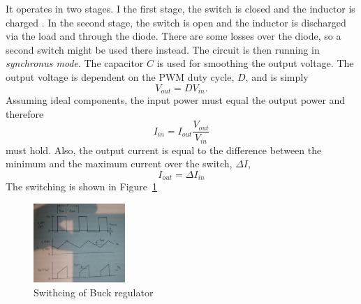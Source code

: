 It operates in two stages. I the first stage, the
switch is closed and the inductor is charged . In the second stage, the switch
is open and the inductor is discharged via the load and through the diode. There
are some losses over the diode, so a second switch might be used there instead.
The circuit is then running in \textit{synchronus mode}. The capacitor $C$ is
used for smoothing the output voltage. The output voltage is dependent on the
PWM duty cycle, $D$, and is simply
\begin{equation}
    V_{out} = DV_{in}.
\end{equation}
Assuming ideal components, the input power must equal the output power and
therefore
\begin{equation}
    I_{in} = I_{out}\frac {V_{out}} {V_{in}}
\end{equation}
must hold. Also, the output current is equal to the difference between the
minimum and the maximum current over the switch, $\Delta I$, 
\begin{equation}
    I_{out} = \Delta I_{in}
\end{equation}
The switching is shown in Figure~\ref{fig:buckswitch}
\begin{figure}[H]
    \centering
    \includegraphics[height=3cm]{./figures/buckswitch.jpg}
    \caption{Swithcing of Buck regulator}
    \label{fig:buckswitch}
\end{figure}

